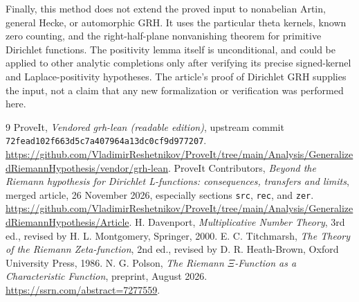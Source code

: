 \documentclass[11pt]{article}
\theoremstyle{remark}\newtheorem{remark}[theorem]{Remark}
\begin{document}
Finally, this method does not extend the proved input to nonabelian Artin, general Hecke, or automorphic GRH. It uses the particular theta kernels, known zero counting, and the right-half-plane nonvanishing theorem for primitive Dirichlet functions. The positivity lemma itself is unconditional, and could be applied to other analytic completions only after verifying its precise signed-kernel and Laplace-positivity hypotheses. The article's proof of Dirichlet GRH supplies the input, not a claim that any new formalization or verification was performed here.

\begin{thebibliography}{9}
 ProveIt, \emph{Vendored grh-lean (readable edition)}, upstream commit \texttt{72fead102f663d5c7a407964a13dc0cf9d977207}. \url{https://github.com/VladimirReshetnikov/ProveIt/tree/main/Analysis/GeneralizedRiemannHypothesis/vendor/grh-lean}.
 ProveIt Contributors, \emph{Beyond the Riemann hypothesis for Dirichlet L-functions: consequences, transfers and limits}, merged article, 26 November 2026, especially sections \texttt{src}, \texttt{rec}, and \texttt{zer}. \url{https://github.com/VladimirReshetnikov/ProveIt/tree/main/Analysis/GeneralizedRiemannHypothesis/Article}.
 H. Davenport, \emph{Multiplicative Number Theory}, 3rd ed., revised by H. L. Montgomery, Springer, 2000.
 E. C. Titchmarsh, \emph{The Theory of the Riemann Zeta-function}, 2nd ed., revised by D. R. Heath-Brown, Oxford University Press, 1986.
 N. G. Polson, \emph{The Riemann $\Xi$-Function as a Characteristic Function}, preprint, August 2026. \url{https://ssrn.com/abstract=7277559}.
\end{thebibliography}
\end{document}
